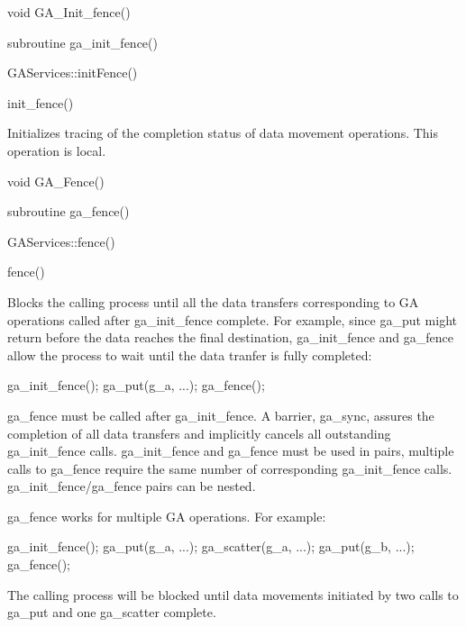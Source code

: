 \documentclass[12pt]{article}
\begin{document}

\begin{capi}
void GA_Init_fence()
\end{capi}

\begin{fapi}
subroutine ga_init_fence()
\end{fapi}

\begin{cxxapi}
GAServices::initFence()
\end{cxxapi}

\begin{pyapi}
init_fence() 
\end{pyapi} 


\begin{desc}

Initializes tracing of the completion status of data movement operations.
This operation is local.
\end{desc}


\begin{capi}
void GA_Fence()
\end{capi}

\begin{fapi}
subroutine ga_fence()
\end{fapi}

\begin{cxxapi}
GAServices::fence()
\end{cxxapi}

\begin{pyapi}
fence() 
\end{pyapi}


\begin{desc}

Blocks the calling process until all the data transfers corresponding to GA 
operations called after ga_init_fence complete. For example, since ga_put 
might return before the data reaches the final destination, ga_init_fence 
and ga_fence allow the process to wait until the data tranfer is fully completed:
\begin{codeseg}
        ga_init_fence();
        ga_put(g_a, ...);
        ga_fence();
\end{codeseg}

ga_fence must be called after ga_init_fence. A barrier, ga_sync, assures the 
completion of all data transfers and implicitly cancels all outstanding 
ga_init_fence calls. ga_init_fence and ga_fence must be used in pairs, multiple 
calls to ga_fence require the same number of corresponding ga_init_fence calls. 
ga_init_fence/ga_fence pairs can be nested.

ga_fence works for multiple GA operations. For example:
\begin{codeseg}
        ga_init_fence();
        ga_put(g_a, ...);
        ga_scatter(g_a, ...);
        ga_put(g_b, ...);
        ga_fence();
\end{codeseg}

The calling process will be blocked until data movements initiated by two calls 
to ga_put and one ga_scatter complete.
\end{desc}
\end{document}
